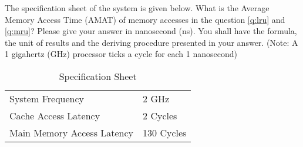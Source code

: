 \begin{questions}
\question[6] 
The specification sheet of the system is given below. What is the
Average Memory Access Time (AMAT) of memory accesses in the question
\ref{q:lru} and \ref{q:mru}? Please give your answer in nanosecond 
(ns). You shall have the formula, the unit of results and the
deriving procedure presented in your answer. (Note: A 1 gigahertz
(GHz) processor ticks a cycle for each 1 nanosecond)

\begin{table}[h]
    \centering
    \begin{tabular}{l l}
        \hline %
        System Frequency           & 2 GHz      \\
        Cache Access Latency       & 2 Cycles   \\
        Main Memory Access Latency & 130 Cycles \\
        \hline %
    \end{tabular}
    \caption{Specification Sheet}
    \label{tab:spec_sheet}
\end{table}

{
    \begin{solution}

        \vspace{1in}
    \end{solution}
}


\end{questions}
